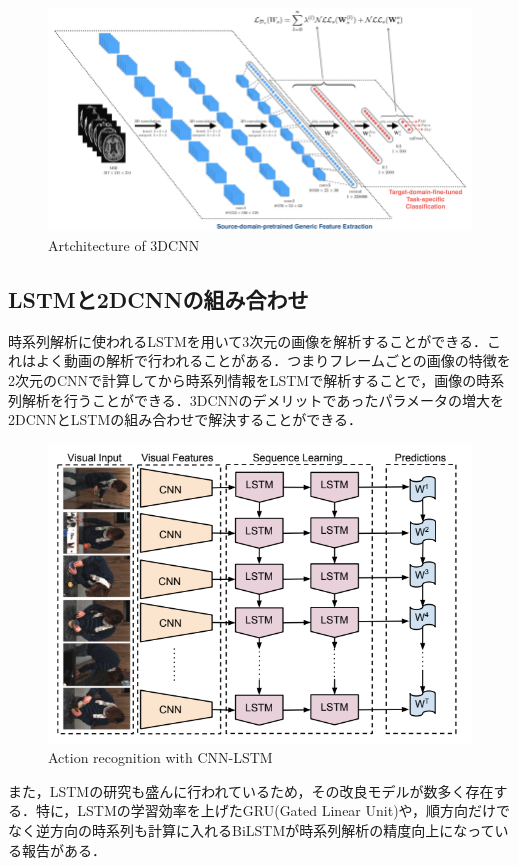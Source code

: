 \begin{figure}[H]
	\centering
	\includegraphics[width=0.7\linewidth]{fig/3d_cnn.png}
	\caption{Artchitecture of 3DCNN\cite{Hosseini-AslGE16}}
	\label{fig:3DCNN}
\end{figure}


\subsection{LSTMと2DCNNの組み合わせ}
時系列解析に使われるLSTMを用いて3次元の画像を解析することができる．これはよく動画の解析で行われることがある．つまりフレームごとの画像の特徴を2次元のCNNで計算してから時系列情報をLSTMで解析することで，画像の時系列解析を行うことができる．3DCNNのデメリットであったパラメータの増大を2DCNNとLSTMの組み合わせで解決することができる\cite{Donahue_2015_CVPR}．

\begin{figure}[H]
	\centering
	\includegraphics[width=0.7\linewidth]{fig/chapter2/cnn_lstm}
	\caption{Action recognition with CNN-LSTM\cite{Donahue_2015_CVPR}}
	\label{fig:cnnlstm}
\end{figure}

また，LSTMの研究も盛んに行われているため，その改良モデルが数多く存在する．特に，LSTMの学習効率を上げたGRU(Gated Linear Unit)\cite{cho2014learning}や，順方向だけでなく逆方向の時系列も計算に入れるBiLSTM\cite{wang2016image}が時系列解析の精度向上になっている報告がある．


